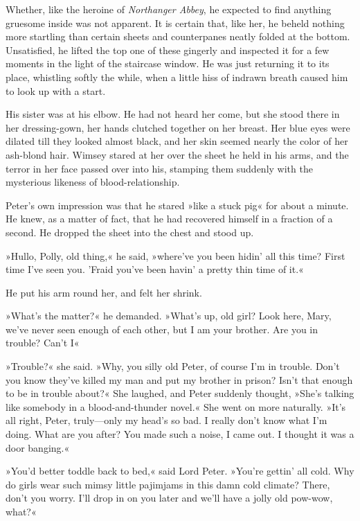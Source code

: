 Whether, like the heroine of \textit{Northanger Abbey}, he expected to find anything gruesome inside was not apparent. It is certain that, like her, he beheld nothing more startling than certain sheets and counterpanes neatly folded at the bottom. Unsatisfied, he lifted the top one of these gingerly and inspected it for a few moments in the light of the staircase window. He was just returning it to its place, whistling softly the while, when a little hiss of indrawn breath caused him to look up with a start.

His sister was at his elbow. He had not heard her come, but she stood there in her dressing-gown, her hands clutched together on her breast.  Her blue eyes were dilated till they looked almost black, and her skin seemed nearly the color of her ash-blond hair. Wimsey stared at her over the sheet he held in his arms, and the terror in her face passed over into his, stamping them suddenly with the mysterious likeness of blood-relationship.

Peter's own impression was that he stared »like a stuck pig« for about a minute. He knew, as a matter of fact, that he had recovered himself in a fraction of a second. He dropped the sheet into the chest and stood up.

»Hullo, Polly, old thing,« he said, »where've you been hidin' all this time? First time I've seen you. 'Fraid you've been havin' a pretty thin time of it.«

He put his arm round her, and felt her shrink.

»What's the matter?« he demanded. »What's up, old girl? Look here, Mary, we've never seen enough of each other, but I am your brother. Are you in trouble? Can't I\longdash«

»Trouble?« she said. »Why, you silly old Peter, of course I'm in trouble. Don't you know they've killed my man and put my brother in prison? Isn't that enough to be in trouble about?« She laughed, and Peter suddenly thought, »She's talking like somebody in a blood-and-thunder novel.« She went on more naturally. »It's all right, Peter, truly\allowbreak---\allowbreak only my head's so bad. I really don't know what I'm doing. What are you after? You made such a noise, I came out. I thought it was a door banging.«

»You'd better toddle back to bed,« said Lord Peter. »You're gettin' all cold. Why do girls wear such mimsy little pajimjams in this damn cold climate? There, don't you worry. I'll drop in on you later and we'll have a jolly old pow-wow, what?«

